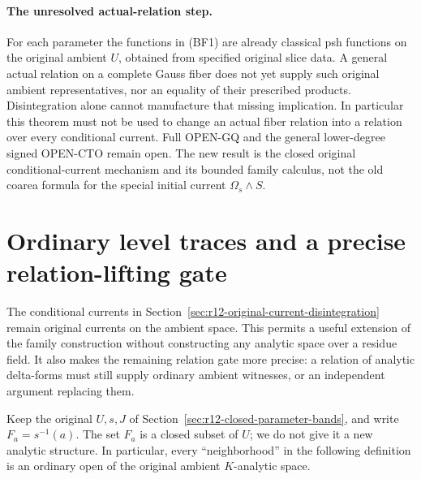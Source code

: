 \documentclass[11pt,a4paper]{article}
\numberwithin{equation}{section}
\theoremstyle{definition}
\theoremstyle{remark}
\begin{document}
\paragraph{The unresolved actual-relation step.}
For each parameter the functions in (BF1) are already classical
psh functions on the original ambient $U$, obtained from specified
original slice data. A general actual relation on a complete Gauss
fiber does not yet supply such original ambient representatives,
nor an equality of their prescribed products. Disintegration alone
cannot manufacture that missing implication. In particular this
theorem must not be used to change an actual fiber relation into a
relation over every conditional current. Full OPEN-GQ and the
general lower-degree signed OPEN-CTO remain open. The new result is
the closed original conditional-current mechanism and its bounded
family calculus, not the old coarea formula for the special initial
current $\Omega_s\wedge S$.



\section{Ordinary level traces and a precise relation-lifting gate}
\label{sec:r12-level-trace-calculus}

The conditional currents in Section~\ref{sec:r12-original-current-disintegration}
remain original currents on the ambient space. This permits a useful
extension of the family construction without constructing any analytic
space over a residue field. It also makes the remaining relation gate
more precise: a relation of analytic delta-forms must still supply
ordinary ambient witnesses, or an independent argument replacing them.

Keep the original $U,s,J$ of Section~\ref{sec:r12-closed-parameter-bands},
and write $F_a=s^{-1}(a)$. The set $F_a$ is a closed subset of $U$;
we do not give it a new analytic structure. In particular, every
``neighborhood'' in the following definition is an ordinary open
of the original ambient $K$-analytic space.
\end{document}
